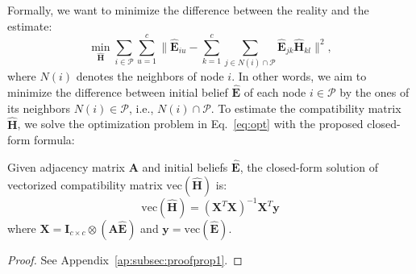 
Formally, we want to minimize the difference between the reality and the estimate:
\begin{equation} \label{eq:opt}
    \min_{\hat{\boldsymbol H}}\sum_{i \in \mathcal{P}}{\sum_{u=1}^{c} \|{\hat{\boldsymbol E}_{iu}} - \sum_{k=1}^{c}{\sum_{j \in N(i) \cap \mathcal{P}}{\hat{\boldsymbol E}_{jk}}\hat{\boldsymbol H}_{kl}}}\|^2,
\end{equation}
where $N(i)$ denotes the neighbors of node $i$. 
In other words, we aim to minimize the difference between initial belief $\hat{\boldsymbol E}$ of each node $i \in \mathcal{P}$ by the ones of its neighbors $N(i) \in \mathcal{P}$, i.e., $N(i) \cap \mathcal{P}$. 
To estimate the compatibility matrix $\hat{{\boldsymbol H}}$, we solve the optimization problem in Eq.~\ref{eq:opt} with the proposed closed-form formula:
\begin{lemma} \label{lem:nef}
Given adjacency matrix ${\boldsymbol A}$ and initial beliefs $\hat{{\boldsymbol E}}$, the closed-form solution of vectorized compatibility matrix $\text{vec}{(\hat{{\boldsymbol H}})}$ is:
\begin{equation}
\boxed{
    \text{vec}{(\hat{{\boldsymbol H}})} = ({\boldsymbol X}^{T}{\boldsymbol X})^{-1}{\boldsymbol X}^{T}{\boldsymbol y}
    }
\end{equation}
where ${\boldsymbol X} = {\boldsymbol I}_{c \times c} \otimes ({\boldsymbol A}\hat{{\boldsymbol E}})$ and ${\boldsymbol y} = \text{vec}{(\hat{{\boldsymbol E}})}$.
\end{lemma}
\begin{proof}
See Appendix~\ref{ap:subsec:proofprop1}.
\end{proof}

